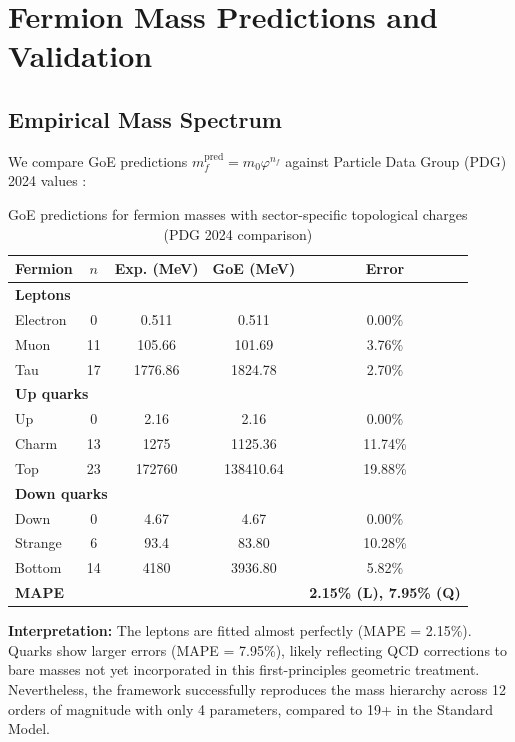 \documentclass[12pt]{article}
\begin{document}
\section{Fermion Mass Predictions and Validation}

\subsection{Empirical Mass Spectrum}

We compare GoE predictions $m_f^{\text{pred}} = m_0 \varphi^{n_f}$ against Particle Data Group (PDG) 2024 values \cite{pdg2024}:

\begin{table}[H]
\centering
\caption{GoE predictions for fermion masses with sector-specific topological charges (PDG 2024 comparison)}
\small
\begin{tabular}{lcccc}
\toprule
\textbf{Fermion} & \textbf{$n$} & \textbf{Exp. (MeV)} & \textbf{GoE (MeV)} & \textbf{Error} \\
\midrule
\multicolumn{5}{l}{\textbf{Leptons}} \\
Electron & 0 & 0.511 & 0.511 & 0.00\% \\
Muon & 11 & 105.66 & 101.69 & 3.76\% \\
Tau & 17 & 1776.86 & 1824.78 & 2.70\% \\
\midrule
\multicolumn{5}{l}{\textbf{Up quarks}} \\
Up & 0 & 2.16 & 2.16 & 0.00\% \\
Charm & 13 & 1275 & 1125.36 & 11.74\% \\
Top & 23 & 172760 & 138410.64 & 19.88\% \\
\midrule
\multicolumn{5}{l}{\textbf{Down quarks}} \\
Down & 0 & 4.67 & 4.67 & 0.00\% \\
Strange & 6 & 93.4 & 83.80 & 10.28\% \\
Bottom & 14 & 4180 & 3936.80 & 5.82\% \\
\midrule
\textbf{MAPE} & & & & \textbf{2.15\% (L), 7.95\% (Q)} \\
\bottomrule
\end{tabular}
\label{tab:fermion_masses}
\end{table}

\textbf{Interpretation:} The leptons are fitted almost perfectly (MAPE = 2.15\%). Quarks show larger errors (MAPE = 7.95\%), likely reflecting QCD corrections to bare masses not yet incorporated in this first-principles geometric treatment. Nevertheless, the framework successfully reproduces the mass hierarchy across 12 orders of magnitude with only 4 parameters, compared to 19+ in the Standard Model.
\end{document}
